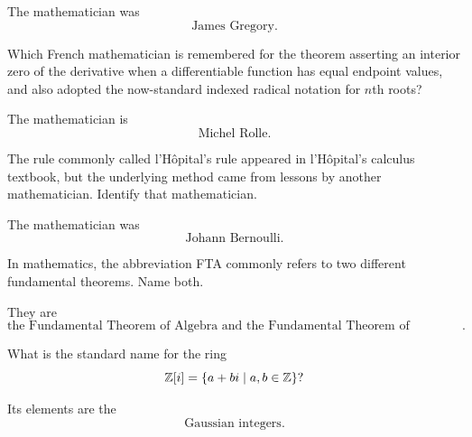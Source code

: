     \begin{solution}
        The mathematician was
        \[
            \boxed{\text{James Gregory}}.
        \]
    \end{solution}

    \begin{expectedproblem}
        Which French mathematician is remembered for the theorem asserting an
        interior zero of the derivative when a differentiable function has
        equal endpoint values, and also adopted the now-standard indexed
        radical notation for $n$th roots?
    \end{expectedproblem}

    \begin{solution}
        The mathematician is
        \[
            \boxed{\text{Michel Rolle}}.
        \]
    \end{solution}

    \begin{expectedproblem}
        The rule commonly called l'H\^opital's rule appeared in
        l'H\^opital's calculus textbook, but the underlying method came from
        lessons by another mathematician. Identify that mathematician.
    \end{expectedproblem}

    \begin{solution}
        The mathematician was
        \[
            \boxed{\text{Johann Bernoulli}}.
        \]
    \end{solution}

    \begin{expectedproblem}
        In mathematics, the abbreviation FTA commonly refers to two different
        fundamental theorems. Name both.
    \end{expectedproblem}

    \begin{solution}
        They are
        \[
            \boxed{
                \text{the Fundamental Theorem of Algebra and the Fundamental
                Theorem of Arithmetic}
            }.
        \]
    \end{solution}

    \begin{expectedproblem}
        What is the standard name for the ring
        \[
            \mathbb{Z}[i]=\{a+bi\mid a,b\in\mathbb{Z}\}?
        \]
    \end{expectedproblem}

    \begin{solution}
        Its elements are the
        \[
            \boxed{\text{Gaussian integers}}.
        \]
    \end{solution}

